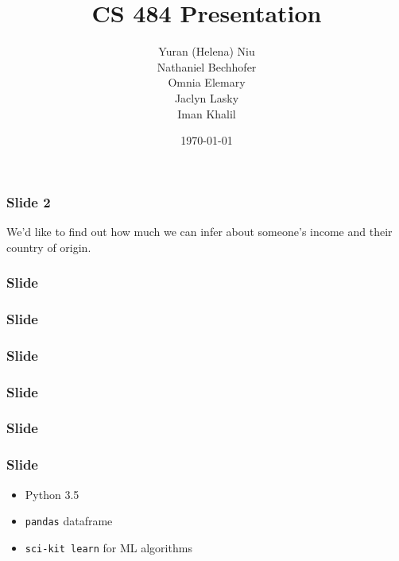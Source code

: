 \documentclass{beamer}
\title{CS 484 Presentation}
\author{Yuran (Helena) Niu \\ Nathaniel Bechhofer \\ Omnia Elemary \\ Jaclyn Lasky \\ Iman Khalil}
\date{\today}
\begin{document}
\frame{\titlepage} %



\frame %
{
  \frametitle{Slide 2}
  We'd like to find out how much we can infer about someone's income and their country of origin.


}

\frame %
{
  \frametitle{Slide }


}

\frame %
{
  \frametitle{Slide }


}

\frame %
{
  \frametitle{Slide }


}

\frame %
{
  \frametitle{Slide }


}


\frame %
{
  \frametitle{Slide }

}

\frame %
{
  \frametitle{Slide }
  \begin{itemize}
  \item Python 3.5
  \item \texttt{pandas} dataframe
  \item \texttt{sci-kit learn} for ML algorithms
  \end{itemize}



}
\end{document}
